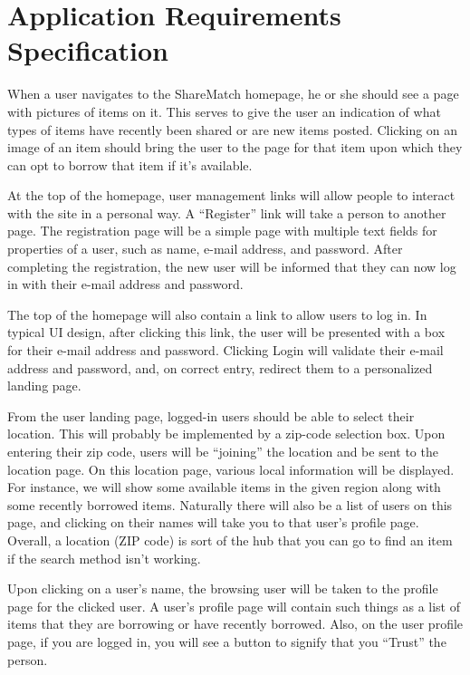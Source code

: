 \documentclass{acm_proc_article-sp}
\begin{document}
\section{Application Requirements Specification}
When a user navigates to the ShareMatch homepage, he or she should see a page with pictures of items on it.
This serves to give the user an indication of what types of items have recently been shared or are new items posted. 
Clicking on an image of an item should bring the user to the page for that item upon which they can opt to borrow that item if it's available.

At the top of the homepage, user management links will allow people to interact with the site in a personal way. 
A ``Register'' link will take a person to another page. The registration page will be a simple page with multiple 
text fields for properties of a user, such as name, e-mail address, and password. After completing the registration, the new user will be informed that they can now log in with their e-mail address and password.

The top of the homepage will also contain a link to allow users to log in. In typical UI design, after clicking this link, the user will be presented with a box for their e-mail address and password. Clicking Login will validate their e-mail address and password, and, on correct entry, redirect them to a personalized landing page.

From the user landing page, logged-in users should be able to select their location. This will probably be implemented by a zip-code selection box. Upon entering their zip code, users will be ``joining'' the location and be sent to the location page.
On this location page, various local information will be displayed. For instance, we will show some available items in the given region along with some recently borrowed items. Naturally there will also be a list of users on this page, and clicking on their names will take you to that user's profile page. Overall, a location (ZIP code) is sort of the hub that you can go to find an item if the search method isn't working.

Upon clicking on a user's name, the browsing user will be taken to the profile page for the clicked user. A user's profile page will contain such things as a list of items that they are borrowing or have recently borrowed. Also, on the user profile page, if you are logged in, you will see a button to signify that you ``Trust'' the person.
\end{document}
